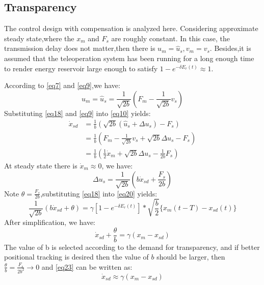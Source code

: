 \subsection{Transparency}
The control design with compensation is analyzed here.
Considering approximate steady state,where the $x_m$ and $F_s$ are roughly constant.
In this case, the transmission delay does not matter,then there is ${{u}_{m}}={{\hat{u}}_{s}},{{v}_{m}}={{v}_{s}}$.
Besides,it is assumed that the teleoperation system has been running for a long enough time
to render energy reservoir large enough to satisfy $1-{{e}^{-\delta {{E}_{r}}(t)}}\approx 1$.
\par According to \eqref{eq7} and \eqref{eq9},we have:
\begin{equation}
    {{u}_{m}}={{\hat{u}}_{s}}=\frac{1}{\sqrt{2b}}
    \left( {{F}_{m}}-\frac{1}{\sqrt{2b}}{{v}_{s}} \right)
    \label{eq21}
\end{equation}
Substituting \eqref{eq18} and \eqref{eq9} into \eqref{eq10} yields:
$$\begin{aligned}
        \dot{x}_{sd} & =\frac{1}{b}(\sqrt{2b}(\hat{u}_{s}+\Delta u_{s})-F_{s})                      \\
                     & =\frac{1}{b}(F_{m}-\frac{1}{\sqrt{2b}}v_{s}+\sqrt{2b}\Delta u_{s}-F_{s})     \\
                     & =\frac{1}{b}(\frac{1}{2}\dot{x}_{m}+\sqrt{2b}\Delta u_{s}-\frac{1}{2b}F_{s})
    \end{aligned}$$
At steady state there is $\dot x_m \approx 0$, we have:
\begin{equation}
    \Delta {{u}_{s}}=\frac{1}{\sqrt{2b}}(b{{\dot{x}}_{sd}}+\frac{{{F}_{s}}}{2b})
    \label{eq22}
\end{equation}
Note $\theta = \frac{{{F}_{s}}}{2b}$,substituting \eqref{eq18} into \eqref{eq20} yields:
$$\frac{1}{\sqrt{2b}}(b{{\dot{x}}_{sd}}+\theta )=\gamma
    \left[ 1-{{e}^{-\delta {{E}_{r}}(t)}} \right]*\sqrt{\frac{b}{2}}\{{{x}_{m}}(t-T)-{{x}_{sd}}(t)\}$$
After simplification, we have:
\begin{equation}
    {{\dot{x}}_{sd}}+\frac{\theta }{b}=\gamma \left( {{x}_{m}}-{{x}_{sd}} \right)
    \label{eq23}
\end{equation}
The value of b is selected according to the demand for transparency,
and if better positional tracking is desired then the value of $b$ should be larger,
then $\frac{\theta }{b}=\frac{{{F}_{s}}}{2{{b}^{2}}}\to 0$ and \eqref{eq23} can be written as:
\begin{equation}
    {{\dot{x}}_{sd}}\approx \gamma \left( {{x}_{m}}-{{x}_{sd}} \right)
    \label{eq24}
\end{equation}
